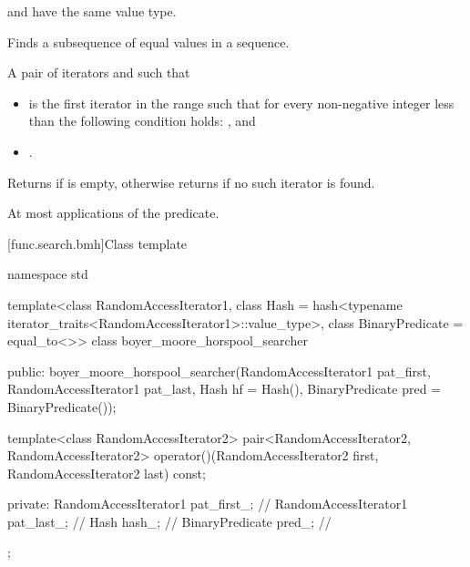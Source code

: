\begin{itemdescr}
\pnum
\mandates
{} and 
have the same value type.

\pnum
\effects
Finds a subsequence of equal values in a sequence.

\pnum
\returns
A pair of iterators  and  such that
\begin{itemize}
\item {} is the first iterator
in the range  such that
for every non-negative integer  less than 
the following condition holds:
, and
\item {}.
\end{itemize}
Returns  if  is empty,
otherwise returns  if no such iterator is found.

\pnum
\complexity
At most  applications of the predicate.
\end{itemdescr}

[func.search.bmh]{Class template }

%
\begin{codeblock}
namespace std {
  template<class RandomAccessIterator1,
           class Hash = hash<typename iterator_traits<RandomAccessIterator1>::value_type>,
           class BinaryPredicate = equal_to<>>
  class boyer_moore_horspool_searcher {
  public:
    boyer_moore_horspool_searcher(RandomAccessIterator1 pat_first,
                                  RandomAccessIterator1 pat_last,
                                  Hash hf = Hash(),
                                  BinaryPredicate pred = BinaryPredicate());

    template<class RandomAccessIterator2>
      pair<RandomAccessIterator2, RandomAccessIterator2>
        operator()(RandomAccessIterator2 first, RandomAccessIterator2 last) const;

  private:
    RandomAccessIterator1 pat_first_;   // \expos
    RandomAccessIterator1 pat_last_;    // \expos
    Hash hash_;                         // \expos
    BinaryPredicate pred_;              // \expos
  };
}
\end{codeblock}

